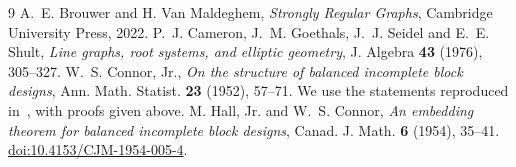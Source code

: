 \documentclass[11pt]{article}
\theoremstyle{definition}
\begin{document}
\begin{thebibliography}{9}
A.~E. Brouwer and H. Van Maldeghem, \emph{Strongly Regular Graphs},
Cambridge University Press, 2022.
P.~J. Cameron, J.~M. Goethals, J.~J. Seidel and E.~E. Shult,
\emph{Line graphs, root systems, and elliptic geometry},
J. Algebra \textbf{43} (1976), 305--327.
W.~S. Connor, Jr., \emph{On the structure of balanced incomplete block
designs}, Ann. Math. Statist. \textbf{23} (1952), 57--71.
We use the statements reproduced in~\cite{HC}, with proofs given above.
M. Hall, Jr. and W.~S. Connor,
\emph{An embedding theorem for balanced incomplete block designs},
Canad. J. Math. \textbf{6} (1954), 35--41.
\href{https://doi.org/10.4153/CJM-1954-005-4}{doi:10.4153/CJM-1954-005-4}.
\end{thebibliography}
\end{document}
